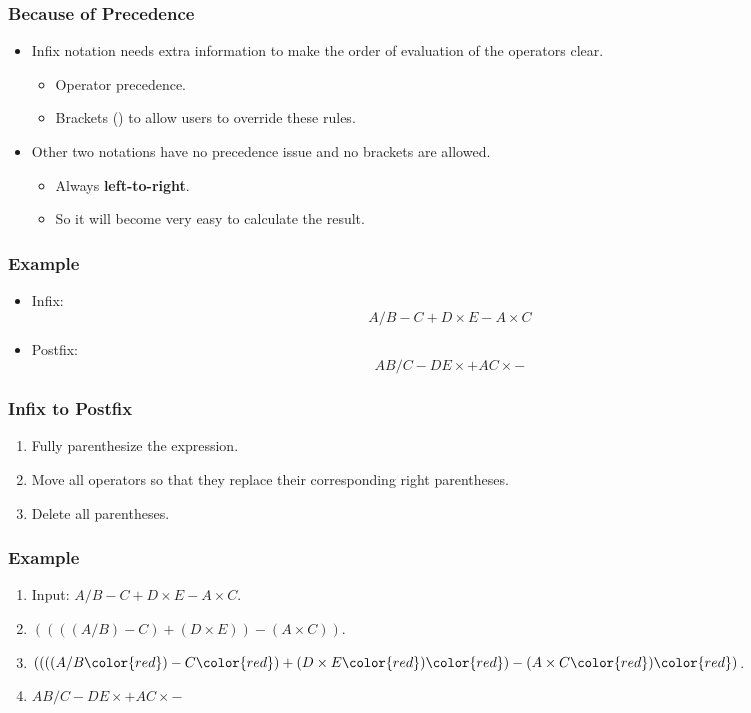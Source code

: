 \documentclass[11pt]{beamer}
\begin{document}
\begin{frame}
\frametitle{Because of Precedence}
\begin{itemize}
\item Infix notation needs extra information to make the order of evaluation of the operators clear.
    \begin{itemize}
    \item {\color{red}Operator precedence}.
    \item {\color{red}Brackets () to allow users to override these rules}.
    \end{itemize} 
\item Other two notations have no precedence issue and no brackets are allowed.
    \begin{itemize}
    \item Always  {\bf\color{blue}left-to-right}.
    \item So it will become very easy to calculate the result.
    \end{itemize}
\end{itemize}
\end{frame}

\begin{frame}
\frametitle{Example}
\begin{itemize}
\item Infix:
    \begin{displaymath}
    A/B-C+D\times E-A\times C
    \end{displaymath}
\item Postfix:
    \begin{displaymath}
    AB/C-DE\times +AC\times -
    \end{displaymath}
\end{itemize}
\end{frame}

\begin{frame}
\frametitle{Infix to Postfix}
\begin{enumerate}
\item Fully parenthesize the expression.
\item Move all operators so that they replace their corresponding right parentheses.
\item Delete all parentheses.
\end{enumerate}
\end{frame}

\begin{frame}
\frametitle{Example}
\begin{enumerate}
\item Input: $A/B-C+D\times E-A\times C$.
\item $((((A/B)-C)+(D\times E))-(A\times C))$.
\item $((((A/B{\color{red})}-C{\color{red})}+(D\times E{\color{red})}{\color{red})}-(A\times C{\color{red})}{\color{red})}$.
\item $AB/C-DE\times+AC\times-$
\end{enumerate}
\end{frame}
\end{document}
